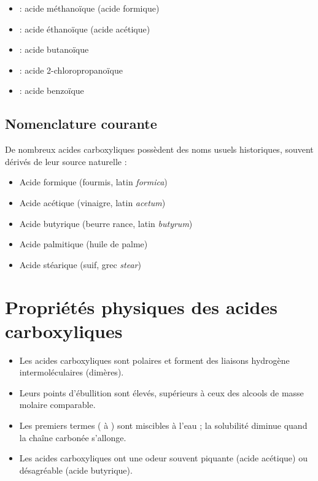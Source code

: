 \begin{exemple}
\begin{itemize}
    \item {} : acide méthanoïque (acide formique)
    \item {} : acide éthanoïque (acide acétique)
    \item {} : acide butanoïque
    \item {} : acide 2-chloropropanoïque
    \item {} : acide benzoïque
\end{itemize}
\end{exemple}

\subsection{Nomenclature courante}

\begin{remarque}
De nombreux acides carboxyliques possèdent des noms usuels historiques, souvent dérivés de leur source naturelle :
\begin{itemize}
    \item Acide formique (fourmis, latin \textit{formica})
    \item Acide acétique (vinaigre, latin \textit{acetum})
    \item Acide butyrique (beurre rance, latin \textit{butyrum})
    \item Acide palmitique (huile de palme)
    \item Acide stéarique (suif, grec \textit{stear})
\end{itemize}
\end{remarque}

\section{Propriétés physiques des acides carboxyliques}

\begin{propriete}
\begin{itemize}
    \item Les acides carboxyliques sont polaires et forment des liaisons hydrogène intermoléculaires (dimères).
    \item Leurs points d'ébullition sont élevés, supérieurs à ceux des alcools de masse molaire comparable.
    \item Les premiers termes ( à ) sont miscibles à l'eau ; la solubilité diminue quand la chaîne carbonée s'allonge.
    \item Les acides carboxyliques ont une odeur souvent piquante (acide acétique) ou désagréable (acide butyrique).
\end{itemize}
\end{propriete}

